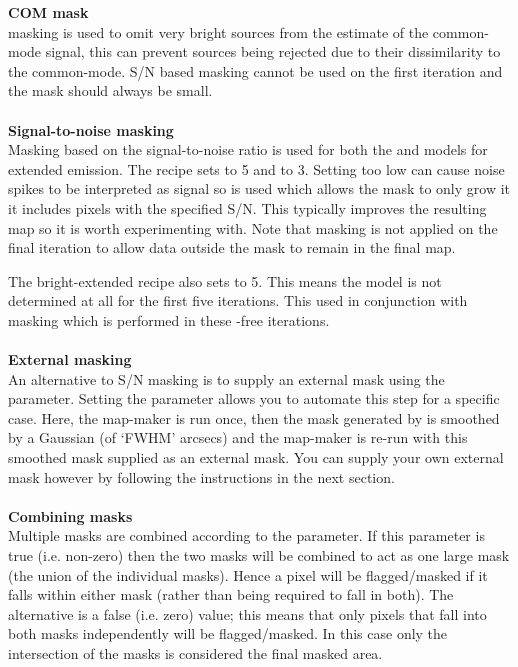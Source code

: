 \documentclass[11pt,oneside,chapters]{starlink}
\begin{document}
\textbf{COM mask}\\
 masking is used to omit very bright sources from the
estimate of the common-mode signal, this can prevent sources being
rejected due to their dissimilarity to the common-mode. S/N based
 masking cannot be used on the first iteration and the
mask should always be small.
\\\\
\textbf{Signal-to-noise masking}\\
Masking based on the signal-to-noise ratio is used for both the 
and  models for extended emission. The recipe
 sets 
to 5 and  to 3. Setting 
too low can cause noise spikes to be interpreted as signal so
 is used which allows the mask to only grow it
it includes pixels with the specified S/N. This typically improves the
resulting map so it is worth experimenting with. Note that 
masking is not applied on the final iteration to allow data outside
the mask to remain in the final map.

The bright-extended recipe also sets  to 5. This
means the  model is not determined at all for the first
five iterations. This used in conjunction with  masking
which is performed in these -free iterations.
\\\\
\textbf{External masking}\\
An alternative to S/N masking is to supply an external mask using the
 parameter. Setting the parameter
 allows you to automate this step for a
specific case. Here, the map-maker is run once, then the mask
generated by  is smoothed by a Gaussian (of
`FWHM' arcsecs) and the map-maker is re-run with this smoothed mask
supplied as an external mask. You can supply your own external mask
however by following the instructions in the next section.
\\\\
\textbf{Combining masks}\\
Multiple masks are combined according to the 
parameter. If this parameter is true (i.e. non-zero) then the two masks
will be combined to act as one large mask (the union of the individual
masks). Hence a pixel will be flagged/masked if it falls within either
mask (rather than being required to fall in both). The alternative is
a false (i.e. zero) value; this means that only pixels that fall into
both masks independently will be flagged/masked. In this case only the
intersection of the masks is considered the final masked area.
\end{document}
